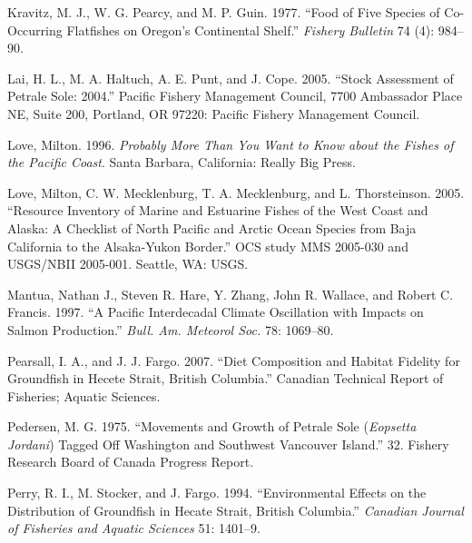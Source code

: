 \documentclass[11pt,
  english,
  letterpaper,
]{article}
\newlength{\cslhangindent}
\newenvironment{CSLReferences}[2] %
 {%
  \setlength{\parindent}{0pt}
  \ifodd #1 \everypar{\setlength{\hangindent}{\cslhangindent}}\ignorespaces\fi
  \ifnum #2 > 0
  \setlength{\parskip}{#2\baselineskip}
  \fi
 }%
 {}
\begin{document}
\begin{CSLReferences}{1}{0}
\leavevmode{}%
Kravitz, M. J., W. G. Pearcy, and M. P. Guin. 1977. {``Food of Five Species of Co-Occurring Flatfishes on {Oregon}'s Continental Shelf.''} \emph{Fishery Bulletin} 74 (4): 984--90.

\leavevmode{}%
Lai, H. L., M. A. Haltuch, A. E. Punt, and J. Cope. 2005. {``Stock Assessment of Petrale Sole: 2004.''} Pacific Fishery Management Council, 7700 Ambassador Place NE, Suite 200, Portland, OR 97220: Pacific Fishery Management Council.

\leavevmode{}%
Love, Milton. 1996. \emph{Probably More Than You Want to Know about the Fishes of the {Pacific} {Coast}}. Santa Barbara, California: Really Big Press.

\leavevmode{}%
Love, Milton, C. W. Mecklenburg, T. A. Mecklenburg, and L. Thorsteinson. 2005. {``Resource Inventory of Marine and Estuarine Fishes of the {West} {Coast} and {Alaska}: A Checklist of North {Pacific} and Arctic Ocean Species from {Baja} {California} to the {Alsaka}-{Yukon} Border.''} OCS study MMS 2005-030 and USGS/NBII 2005-001. Seattle, WA: USGS.

\leavevmode{}%
Mantua, Nathan J., Steven R. Hare, Y. Zhang, John R. Wallace, and Robert C. Francis. 1997. {``A {Pacific} Interdecadal Climate Oscillation with Impacts on Salmon Production.''} \emph{Bull. Am. Meteorol Soc.} 78: 1069--80.

\leavevmode{}%
Pearsall, I. A., and J. J. Fargo. 2007. {``Diet Composition and Habitat Fidelity for Groundfish in {Hecete} {Strait}, {British} {Columbia}.''} Canadian Technical Report of Fisheries; Aquatic Sciences.

\leavevmode{}%
Pedersen, M. G. 1975. {``Movements and Growth of Petrale Sole (\emph{{Eopsetta} Jordani}) Tagged Off {Washington} and Southwest {Vancouver} {Island}.''} 32. Fishery Research Board of Canada Progress Report.

\leavevmode{}%
Perry, R. I., M. Stocker, and J. Fargo. 1994. {``Environmental Effects on the Distribution of Groundfish in {Hecate} {Strait}, {British} {Columbia}.''} \emph{Canadian Journal of Fisheries and Aquatic Sciences} 51: 1401--9.


\end{CSLReferences}
\end{document}
